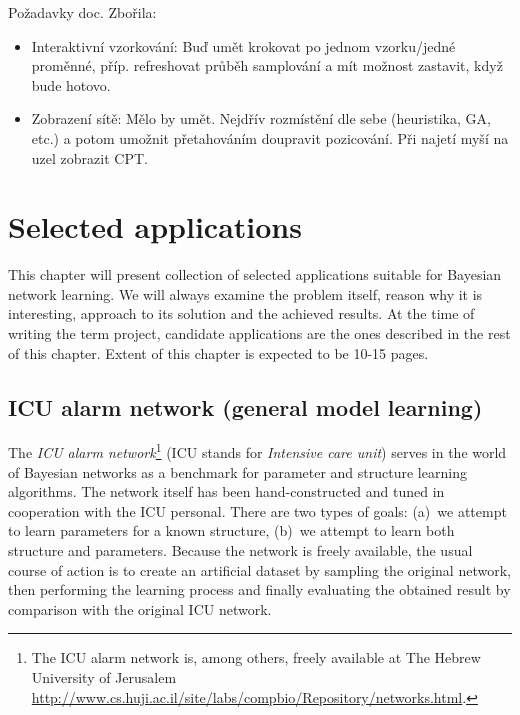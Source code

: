 \documentclass[english,cover]{fitthesis} %
\newcommand{\term}[1]{\emph{#1}}           %
\newcommand{\ignore}[1]{}                  %
\newcommand{\todo}[1]{{\color{red}#1}}
\begin{document}
\todo{
Požadavky doc. Zbořila:
\begin{itemize}
	\item Interaktivní vzorkování: Buď umět krokovat po jednom vzorku/jedné proměnné, příp. refreshovat průběh samplování a mít možnost zastavit, když bude hotovo.
	\item Zobrazení sítě: Mělo by umět. Nejdřív rozmístění dle sebe (heuristika, GA, etc.) a potom umožnit přetahováním doupravit pozicování. Při najetí myší na uzel zobrazit CPT.
\end{itemize}
}





















\chapter{Selected applications}
This chapter will present collection of selected applications suitable for Bayesian network learning. We will always examine the problem itself, reason why it is interesting, approach to its solution and the achieved results. At the time of writing the term project, candidate applications are the ones described in the rest of this chapter. Extent of this chapter is expected to be 10-15 pages.

\section{ICU alarm network (general model learning)}
The \term{ICU alarm network}\footnote{The ICU alarm network is, among others, freely available at The Hebrew University of Jerusalem \ignore{\url{http://www.bnlearn.com/bnrepository/}}\url{http://www.cs.huji.ac.il/site/labs/compbio/Repository/networks.html}.} (ICU stands for \term{Intensive care unit}) serves in the world of Bayesian networks as a benchmark for parameter and structure learning algorithms. The network itself has been hand-constructed and tuned in cooperation with the ICU personal. There are two types of goals: (a)~we attempt to learn parameters for a known structure, (b)~we attempt to learn both structure and parameters. Because the network is freely available, the usual course of action is to create an artificial dataset by sampling the original network, then performing the learning process and finally evaluating the obtained result by comparison with the original ICU network.
\end{document}
